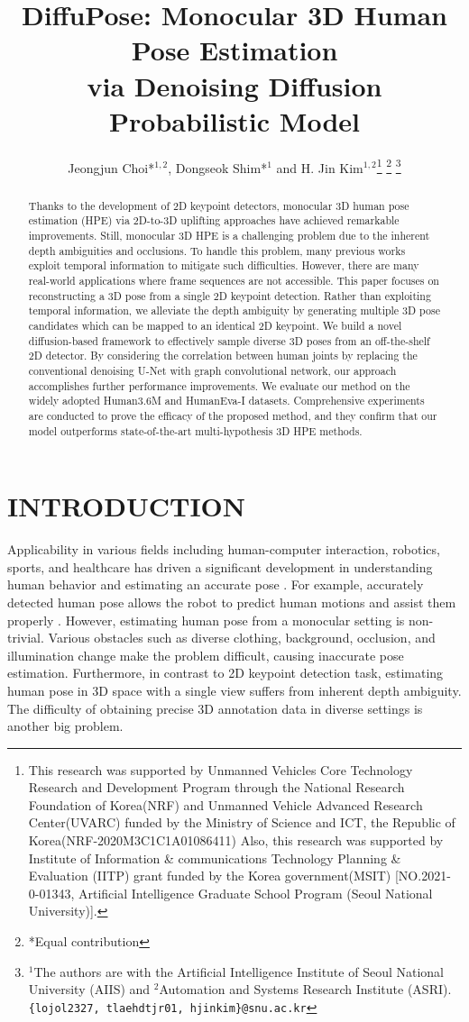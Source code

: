 \documentclass[letterpaper, 10 pt, conference]{ieeeconf}
\title{\LARGE \bf
DiffuPose: Monocular 3D Human Pose Estimation\\via Denoising Diffusion Probabilistic Model  
}
\author{Jeongjun Choi*$^{1,2}$, Dongseok Shim*$^{1}$ and H. Jin Kim$^{1,2}$\thanks{This research was supported by Unmanned Vehicles Core Technology Research and Development Program through the National Research  Foundation of Korea(NRF) and Unmanned Vehicle Advanced Research Center(UVARC) funded by the Ministry of Science and ICT, the Republic of Korea(NRF-2020M3C1C1A01086411) Also, this research was supported by Institute of Information \&
communications Technology Planning \& Evaluation (IITP)
grant funded by the Korea government(MSIT) [NO.2021-
0-01343, Artificial Intelligence Graduate School Program
(Seoul National University)].}
\thanks{*Equal contribution}
\thanks{$^{1}$The authors are with the Artificial Intelligence Institute of Seoul National University (AIIS) and $^{2}$Automation and Systems Research Institute (ASRI). 
        {\tt\small \{lojol2327, tlaehdtjr01, hjinkim\}@snu.ac.kr}}}
\begin{document}
\maketitle
\thispagestyle{empty}
\pagestyle{empty}


\begin{abstract}

 Thanks to the development of 2D keypoint detectors, monocular 3D human pose estimation (HPE) via 2D-to-3D uplifting approaches have achieved remarkable improvements.
    Still, monocular 3D HPE is a challenging problem due to the inherent depth ambiguities and occlusions.
    To handle this problem, many previous works exploit temporal information to mitigate such difficulties.
    However, there are many real-world applications where frame sequences are not accessible. 
    This paper focuses on reconstructing a 3D pose from a single 2D keypoint detection.
    Rather than exploiting temporal information, we alleviate the depth ambiguity by generating multiple 3D pose candidates which can be mapped to an identical 2D keypoint.
    We build a novel diffusion-based framework to effectively sample diverse 3D poses from an off-the-shelf 2D detector.
    By considering the correlation between human joints by replacing the conventional denoising U-Net with graph convolutional network, our approach accomplishes further performance improvements.
    We evaluate our method on the widely adopted Human3.6M and HumanEva-I datasets.
    Comprehensive experiments are conducted to prove the efficacy of the proposed method, and they confirm that our model outperforms state-of-the-art multi-hypothesis 3D HPE methods.

\end{abstract}
\section{INTRODUCTION}

Applicability in various fields including human-computer interaction, robotics, sports, and healthcare has driven a significant development in understanding human behavior and estimating an accurate pose \cite{clever20183d, martinez2020residual, zimmermann20183d, reily2020simultaneous}.
For example, accurately detected human pose allows the robot to predict human motions and assist them properly \cite{gui2018teaching, erickson2022characterizing}.
However, estimating human pose from a monocular setting is non-trivial.
Various obstacles such as diverse clothing, background, occlusion, and illumination change make the problem difficult, causing inaccurate pose estimation.
Furthermore, in contrast to 2D keypoint detection task, estimating human pose in 3D space with a single view suffers from inherent depth ambiguity.
The difficulty of obtaining precise 3D annotation data in diverse settings is another big problem.
\end{document}
